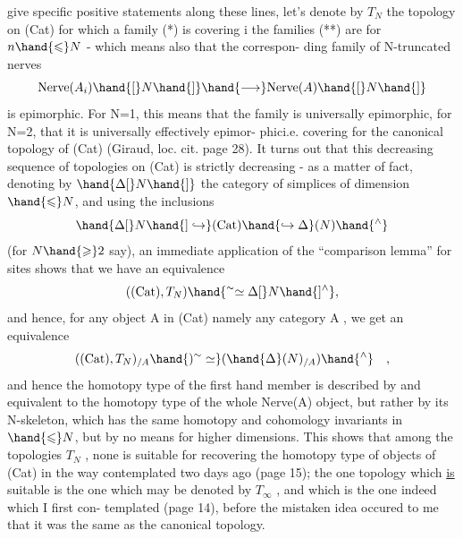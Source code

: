give specific positive statements along these lines, let's  denote
by $T_N$ the topology on (Cat) for which a family (*) is covering i
the families (**) are for $n\hand{\leqslant} N$ - which means also that the correspon-%
ding family of N-truncated nerves
\[ \mathrm{Nerve}(A_i)\hand{[}N\hand{]} \hand{\longrightarrow} \mathrm{Nerve}(A)\hand{[}N\hand{]} \]
is epimorphic. For N=1, this means that the family is universally
epimorphic, for N=2, that it is universally effectively epimor-%
phici.e. covering for the canonical topology of (Cat) (Giraud, loc.
cit. page 28). It turns out that this decreasing sequence of topologies
on (Cat) is strictly decreasing - as a matter of fact, denoting by
$\hand{\Delta[}N\hand{]}$ the category of simplices of dimension $\hand{\leqslant} N$, and using the
inclusions
\[ \hand{\Delta[}N\hand{]\hookrightarrow}(\mathrm{Cat})\hand{\hookrightarrow\Delta}(N)\hand{^{\wedge}} \]
(for $N\hand{\geqslant}2$ say), an immediate application of the ``comparison lemma'' for
sites shows that we have an equivalence
\[ ((\mathrm{Cat}),T_N)\hand{^{\sim}\simeq\Delta[}N\hand{]^{\wedge}}, \]
and hence, for any object A in (Cat) namely any category A , we get
an equivalence
\[ ((\mathrm{Cat}),T_N)_{/A}\hand{)^{\sim}\simeq}(\hand{\Delta}(N)_{/A})\hand{^{\wedge}} \quad , \]
and hence the homotopy type of the first hand member is  described by and
equivalent to the homotopy type of the whole Nerve(A) object, but
rather by its N-skeleton, which has the same homotopy and cohomology
invariants in   $\hand{\leqslant} N$, but by no means for higher dimensions. This
shows that among the topologies $T_N$ , none is suitable for recovering
the homotopy type of objects of (Cat) in the way contemplated two days
ago (page 15);  the one topology which \uline{is} suitable is the one which
may be denoted by $T_{\infty}$ , and which is the one indeed which I first con-%
templated (page 14), before the mistaken idea occured to me that it was
the same as the canonical topology.

